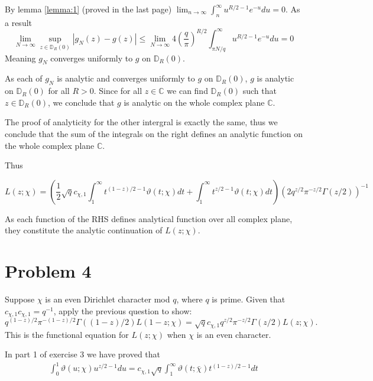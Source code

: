 \documentclass{article}
\theoremstyle{definition}
\theoremstyle{definition}
\theoremstyle{remark}
\newcommand{\D}{\mathbb{D}_R(0)}
\newcommand{\bb}[1]{\mathbb{#1}} %
\begin{document}
By lemma \ref{lemma:1} (proved in the last page) $\lim_{n \rightarrow \infty}\int^{\infty}_{n} u^{R/2-1} e^{-u} du = 0 $. 
As a result
$$
\lim_{N \rightarrow  \infty }\sup_{z \in \D} |g_N(z) - g(z)| \leq \lim_{N \rightarrow \infty} 4 \left(\frac{q}{\pi}\right)^{R/2}\int^{\infty}_{\pi N / q} u^{R/2-1} e^{-u} du  = 0 
$$
Meaning $g_N$ converges uniformly to $g$ on $\D$.

As each of $g_N$ is analytic and converges uniformly to $g$ on $\D$, $g$ is analytic on $\D$ for all $R > 0$.
Since for all $z \in \bb{C}$ we can find $\D$ such that $z \in \D$, we conclude that $g$ is analytic on the whole complex plane $\bb{C}$.

The proof of analyticity for the other intergral is exactly the same, thus we conclude that the sum of the integrals on the right defines an analytic function on the whole complex plane $\mathbb{C}$. 

Thus 

\begin{dmath}
	L(z; \chi) = \left(\frac{1}{2} \sqrt{q} c_{\chi,1} \int_1^{\infty} t^{(1-z)/2-1}\vartheta(t;\chi) dt + \int_1^{\infty} t^{z/2-1}\vartheta(t;\chi) dt \right) (2q^{z/2}\pi^{-z/2}\Gamma(z/2))^{-1}
\end{dmath}

As each function of the RHS defines analytical function over all complex plane, they constitute the analytic continuation of $L(z;\chi)$.



\newpage

\section*{Problem 4}
Suppose $\chi$ is an even Dirichlet character mod $q$, where $q$ is prime. Given that $c_{\chi,1}c_{\chi,1} = q^{-1}$, apply the previous question to show:
\begin{equation*}
    q^{(1-z)/2}\pi^{-(1-z)/2}\Gamma((1-z)/2)L(1-z;\chi) = \sqrt{q} c_{\chi,1} q^{z/2}\pi^{-z/2}\Gamma(z/2)L(z;\chi).
\end{equation*}
This is the functional equation for $L(z;\chi)$ when $\chi$ is an even character.

In part 1 of exercise 3 we have proved that 
\begin{align}
	\int_0^1 \vartheta(u;\chi) u^{z/2-1} du =  c_{\chi,1} \sqrt{q} \int^{\infty}_{1} \vartheta(t;\bar{\chi})t^{(1-z)/2 - 1} dt
\end{align}
\end{document}
